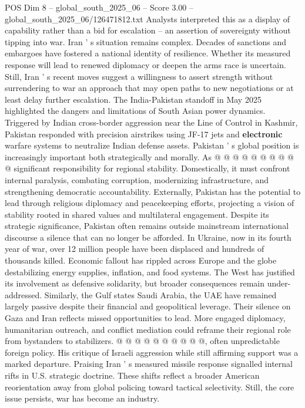 \begin{textsample}{POS Dim 8 – global\_south\_2025\_06 – Score 3.00 – global\_south\_2025\_06/126471812.txt}
Analysts interpreted this as a display of capability rather than a bid for escalation -- an assertion of sovereignty without tipping into war.
Iran ' s situation remains complex.
Decades of sanctions and embargoes have fostered a national identity of resilience.
Whether its measured response will lead to renewed diplomacy or deepen the arms race is uncertain.
Still, Iran ' s recent moves suggest a willingness to assert strength without surrendering to war an approach that may open paths to new negotiations or at least delay further escalation.
The India-Pakistan standoff in May 2025 highlighted the dangers and limitations of South Asian power dynamics.
Triggered by Indian cross-border aggression near the Line of Control in Kashmir, Pakistan responded with precision airstrikes using JF-17 jets and \textbf{electronic} warfare systems to neutralize Indian defense assets.
Pakistan ' s global position is increasingly important both strategically and morally.
As @ @ @ @ @ @ @ @ @ @ significant responsibility for regional stability.
Domestically, it must confront internal paralysis, combating corruption, modernizing infrastructure, and strengthening democratic accountability.
Externally, Pakistan has the potential to lead through religious diplomacy and peacekeeping efforts, projecting a vision of stability rooted in shared values and multilateral engagement.
Despite its strategic significance, Pakistan often remains outside mainstream international discourse a silence that can no longer be afforded.
In Ukraine, now in its fourth year of war, over 12 million people have been displaced and hundreds of thousands killed.
Economic fallout has rippled across Europe and the globe destabilizing energy supplies, inflation, and food systems.
The West has justified its involvement as defensive solidarity, but broader consequences remain under-addressed.
Similarly, the Gulf states Saudi Arabia, the UAE have remained largely passive despite their financial and geopolitical leverage.
Their silence on Gaza and Iran reflects missed opportunities to lead.
More engaged diplomacy, humanitarian outreach, and conflict mediation could reframe their regional role from bystanders to stabilizers. @ @ @ @ @ @ @ @ @ @, often unpredictable foreign policy.
His critique of Israeli aggression while still affirming support was a marked departure.
Praising Iran ' s measured missile response signalled internal rifts in U.S. strategic doctrine.
These shifts reflect a broader American reorientation away from global policing toward tactical selectivity.
Still, the core issue persists, war has become an industry.

\end{textsample}
